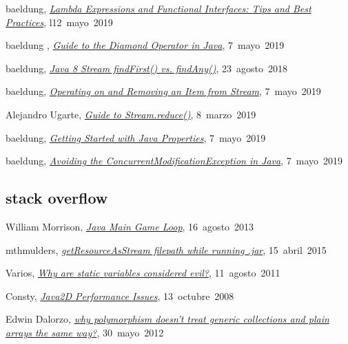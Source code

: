 baeldung,
\href{https://www.baeldung.com/java-8-lambda-expressions-tips}{\textit{Lambda Expressions and Functional Interfaces: Tips and Best Practices}},
\mbox{l12 mayo 2019}

 baeldung ,
\href{https://www.baeldung.com/java-diamond-operator}{\textit{Guide to the Diamond Operator in Java}},
\mbox{7 mayo 2019}

baeldung,
\href{https://www.baeldung.com/java-stream-findfirst-vs-findany}{\textit{Java 8 Stream findFirst() vs. findAny()}},
\mbox{23 agosto 2018}

baeldung,
\href{https://www.baeldung.com/java-use-remove-item-stream}{\textit{Operating on and Removing an Item from Stream}},
\mbox{7 mayo 2019}

Alejandro Ugarte,
\href{https://www.baeldung.com/java-stream-reduce}{\textit{Guide to Stream.reduce()}},
\mbox{8 marzo 2019}

 baeldung,
\href{https://www.baeldung.com/java-properties}{\textit{Getting Started with Java Properties}},
\mbox{7 mayo 2019}

baeldung,
\href{https://www.baeldung.com/java-concurrentmodificationexception}{\textit{Avoiding the ConcurrentModificationException in Java}},
\mbox{7 mayo 2019}

\subsection*{stack overflow}

William Morrison,
\href{https://stackoverflow.com/a/18283279}{\textit{Java Main Game Loop}},
\mbox{16 agosto 2013}

mthmulders,
\href{https://stackoverflow.com/a/16010612}{\textit{getResourceAsStream filepath while running .jar}},
\mbox{15 abril 2015}

Varios,
\href{https://stackoverflow.com/questions/7026507/why-are-static-variables-considered-evil}{\textit{Why are static variables considered evil?}},
\mbox{11 agosto 2011}

Consty,
\href{https://stackoverflow.com/a/197060}{\textit{Java2D Performance Issues}},
\mbox{13 octubre 2008}

Edwin Dalorzo,
\href{https://stackoverflow.com/a/10816632}{\textit{why polymorphism doesn't treat generic collections and plain arrays the same way?}},
\mbox{30 mayo 2012}

